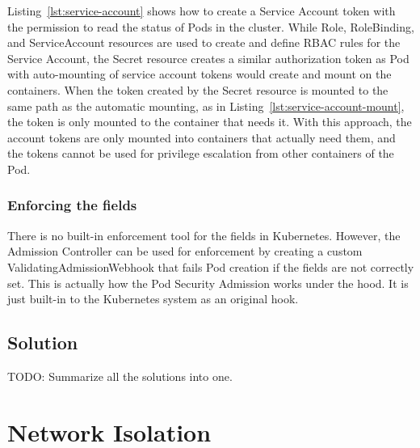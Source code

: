 \documentclass[english, 12pt, a4paper, sci, utf8, a-2b, online]{aaltothesis}
\begin{document}
Listing~\ref{lst:service-account} shows how to create a Service Account token with the permission to read the status of Pods in the cluster. While Role, RoleBinding, and ServiceAccount resources are used to create and define RBAC rules for the Service Account, the Secret resource creates a similar authorization token as Pod with auto-mounting of service account tokens would create and mount on the containers. When the token created by the Secret resource is mounted to the same path as the automatic mounting, as in Listing~\ref{lst:service-account-mount}, the token is only mounted to the container that needs it. With this approach, the account tokens are only mounted into containers that actually need them, and the tokens cannot be used for privilege escalation from other containers of the Pod.



\subsubsection{Enforcing the fields}

There is no built-in enforcement tool for the fields in Kubernetes. However, the Admission Controller can be used for enforcement by creating a custom ValidatingAdmissionWebhook that fails Pod creation if the fields are not correctly set. This is actually how the Pod Security Admission works under the hood. It is just built-in to the Kubernetes system as an original hook.


\subsection{Solution}

TODO: Summarize all the solutions into one.

\clearpage

\section{Network Isolation} \label{sec:network-solution}
\end{document}
